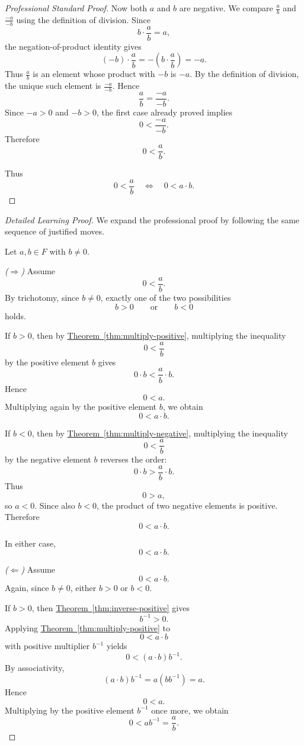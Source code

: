 \begin{proof}[Professional Standard Proof]
Now both $a$ and $b$ are negative.  We compare $\frac{a}{b}$ and
$\frac{-a}{-b}$ using the definition of division.  Since
\[
b\cdot\frac{a}{b}=a,
\]
the negation-of-product identity gives
\[
(-b)\cdot\frac{a}{b}
=
-\left(b\cdot\frac{a}{b}\right)
=
-a.
\]
Thus $\frac{a}{b}$ is an element whose product with $-b$ is $-a$.  By the
definition of division, the unique such element is $\frac{-a}{-b}$.  Hence
\[
\frac{a}{b}=\frac{-a}{-b}.
\]
Since $-a>0$ and $-b>0$, the first case already proved implies
\[
0<\frac{-a}{-b}.
\]
Therefore
\[
0<\frac{a}{b}.
\]

Thus
\[
0<\frac{a}{b}
\quad\Longleftrightarrow\quad
0<a\cdot b.
\]
\end{proof}

\begin{proof}[Detailed Learning Proof]
\LRAProofBodyStart
We expand the professional proof by following the same sequence of justified moves.

Let $a,b\in F$ with $b\neq 0$.

\emph{($\Rightarrow$)} Assume
\[
0<\frac{a}{b}.
\]
By trichotomy, since $b\neq 0$, exactly one of the two possibilities
\[
b>0
\qquad\text{or}\qquad
b<0
\]
holds.

If $b>0$, then by
\hyperref[thm:multiply-positive]{Theorem~\ref*{thm:multiply-positive}},
multiplying the inequality
\[
0<\frac{a}{b}
\]
by the positive element $b$ gives
\[
0\cdot b<\frac{a}{b}\cdot b.
\]
Hence
\[
0<a.
\]
Multiplying again by the positive element $b$, we obtain
\[
0<a\cdot b.
\]

If $b<0$, then by
\hyperref[thm:multiply-negative]{Theorem~\ref*{thm:multiply-negative}},
multiplying the inequality
\[
0<\frac{a}{b}
\]
by the negative element $b$ reverses the order:
\[
0\cdot b>\frac{a}{b}\cdot b.
\]
Thus
\[
0>a,
\]
so $a<0$.  Since also $b<0$, the product of two negative elements is
positive.  Therefore
\[
0<a\cdot b.
\]

In either case,
\[
0<a\cdot b.
\]

\emph{($\Leftarrow$)} Assume
\[
0<a\cdot b.
\]
Again, since $b\neq 0$, either $b>0$ or $b<0$.

If $b>0$, then
\hyperref[thm:inverse-positive]{Theorem~\ref*{thm:inverse-positive}}
gives
\[
b^{-1}>0.
\]
Applying
\hyperref[thm:multiply-positive]{Theorem~\ref*{thm:multiply-positive}}
to
\[
0<a\cdot b
\]
with positive multiplier $b^{-1}$ yields
\[
0<(a\cdot b)b^{-1}.
\]
By associativity,
\[
(a\cdot b)b^{-1}=a(bb^{-1})=a.
\]
Hence
\[
0<a.
\]
Multiplying by the positive element $b^{-1}$ once more, we obtain
\[
0<ab^{-1}=\frac{a}{b}.
\]


\end{proof}
